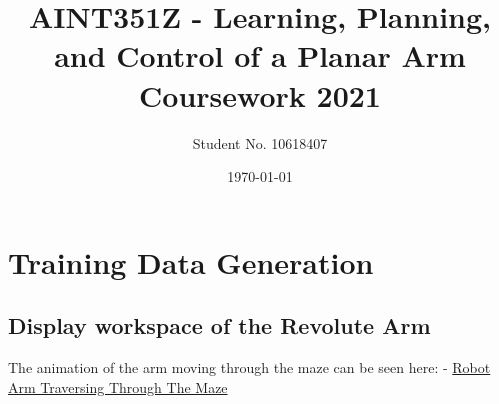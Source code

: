 \documentclass [11pt]{article}
\begin{document}
							
\title{\bf AINT351Z - Learning, Planning, and Control of a Planar Arm Coursework 2021} 	
\author{Student No. 10618407} 								
\date{\today} 										
\maketitle 												
{}			
\newpage			
\setcounter{page}{2}								
\tableofcontents 
\newpage

\section{Training Data Generation}	
\subsection{Display workspace of the Revolute Arm}

The animation of the arm moving through the maze can be seen here: - \href{https://youtu.be/_ZtAD1VYlzo}{Robot Arm Traversing Through The Maze}
\end{document}

